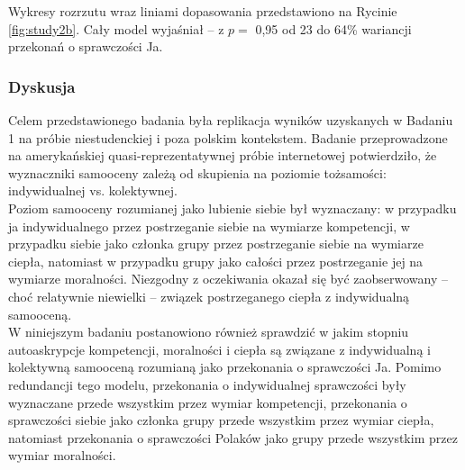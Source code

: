 \documentclass[man]{apa6}
\begin{document}
Wykresy rozrzutu wraz liniami dopasowania przedstawiono na Rycinie \ref{fig:study2b}. Cały model wyjaśniał -- z $p =$ 0,95 od 23 do 64\% wariancji przekonań o sprawczości Ja.\\

\begin{figure*}[htbp]
   \centering
   \caption{Autoaskrypcja cech związanych w wymiarami kompetencji, moralności i ciepła, a poziom przekonań o własnej sprawczości. Punkty oznaczają latentne wyniki dla każdej osoby, z kreskami oznaczającymi błędy pomiarowe. Grubą linią przerywaną oznaczono najlepsze dopasowanie uzyskane w modelu regresyjnym, z cieńszymi liniami oznaczającymi błąd oszacowania.}

   \label{fig:study2b}
\end{figure*}


\subsubsection{Dyskusja}
Celem przedstawionego badania była replikacja wyników uzyskanych w Badaniu 1 na próbie niestudenckiej i poza polskim kontekstem. Badanie przeprowadzone na amerykańskiej quasi-reprezentatywnej próbie internetowej potwierdziło, że wyznaczniki samooceny zależą od skupienia na poziomie tożsamości: indywidualnej vs. kolektywnej.\\
Poziom samooceny rozumianej jako lubienie siebie był wyznaczany: w przypadku ja indywidualnego przez postrzeganie siebie na wymiarze kompetencji, w przypadku siebie jako członka grupy przez postrzeganie siebie na wymiarze ciepła, natomiast w przypadku grupy jako całości przez postrzeganie jej na wymiarze moralności. Niezgodny z oczekiwania okazał się być zaobserwowany -- choć relatywnie niewielki -- związek postrzeganego ciepła z indywidualną samooceną. \\

W niniejszym badaniu postanowiono również sprawdzić w jakim stopniu autoaskrypcje kompetencji, moralności i ciepła są związane z indywidualną i kolektywną samooceną rozumianą jako przekonania o sprawczości Ja. Pomimo redundancji tego modelu, przekonania o indywidualnej sprawczości były wyznaczane przede wszystkim przez wymiar kompetencji, przekonania o sprawczości siebie jako członka grupy przede wszystkim przez wymiar ciepła, natomiast przekonania o sprawczości Polaków jako grupy przede wszystkim przez wymiar moralności.\\


\newpage
\end{document}
